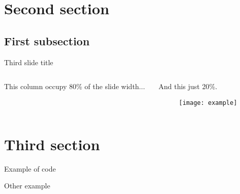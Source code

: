 \section{Second section}
\subsection{First subsection}

\begin{frame}{Third slide title}
	\begin{columns}
		\begin{column}{0.8\textwidth} %
			This column occupy 80\% of the slide width...
			\pause
		\end{column}
		\begin{column}{0.2\textwidth}
			And this just 20\%.\\
			\begin{figure}
				\centering
				\texttt{[image: example]}
			\end{figure}
		\end{column}
	\end{columns}
\end{frame}

\section{Third section}

\begin{frame}{Example of code}
\end{frame}

\begin{frame}{Other example}
	\centering %
\end{frame}
